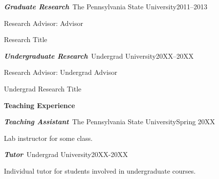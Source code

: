 \documentclass[11pt]{psuthesis2side}
\begin{document}
{\begin{singlespace}
%

\medskip

\par\noindent
\textbf{\textit{Graduate Research}}\, The Pennsylvania State University\hfill 2011--2013
\par\noindent
Research Advisor: Advisor

\smallskip

\par\noindent
\hspace{0.10truein}  
\parbox{5.7truein}{
\par\noindent
Research Title
}

\medskip

\par\noindent
\textbf{\textit{Undergraduate Research}}\, Undergrad University\hfill 20XX--20XX
\par\noindent
Research Advisor: Undergrad Advisor

\smallskip

\par\noindent
\hspace{0.10truein}  
\parbox{5.7truein}{
\par\noindent
Undergrad Research Title
}

\medskip

\large
\centerline{{\bf Teaching Experience}}
\normalsize

%
%
%

\medskip

\par\noindent
\textbf{\textit{Teaching Assistant}}\, The Pennsylvania State University\hfill Spring 20XX

\smallskip

\par\noindent
\hspace{0.10truein}  
\parbox{5.7truein}{
\par\noindent
Lab instructor for some class.
}

\medskip

\par\noindent
\textbf{\textit{Tutor}}\, Undergrad University\hfill 20XX-20XX

\smallskip

\par\noindent
\hspace{0.10truein}  
\parbox{5.7truein}{
\par\noindent
Individual tutor for students involved in undergraduate courses.
}
\end{singlespace}
}
\end{document}
